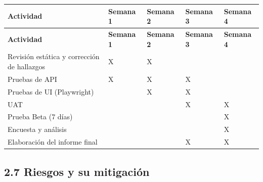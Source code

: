 \documentclass[11pt,a4paper]{article}
\begin{document}
{\small
\begin{longtable}{|p{}|p{}|p{}|p{}|p{}|}
\rowcolor{UTECblue}\color{white}\bfseries Actividad & \color{white}\bfseries Semana 1 & \color{white}\bfseries Semana 2 & \color{white}\bfseries Semana 3 & \color{white}\bfseries Semana 4 \\ \hline
\endfirsthead
\rowcolor{UTECblue}\color{white}\bfseries Actividad & \color{white}\bfseries Semana 1 & \color{white}\bfseries Semana 2 & \color{white}\bfseries Semana 3 & \color{white}\bfseries Semana 4 \\ \hline
\endhead
Revisión estática y corrección de hallazgos & X & X &  &  \\ \hline
Pruebas de API & X & X & X &  \\ \hline
Pruebas de UI (Playwright) &  & X & X &  \\ \hline
UAT &  &  & X & X \\ \hline
Prueba Beta (7 días) &  &  &  & X \\ \hline
Encuesta y análisis &  &  &  & X \\ \hline
Elaboración del informe final &  &  & X & X \\ \hline
\end{longtable}}


\subsection*{2.7 Riesgos y su mitigación}
\end{document}
